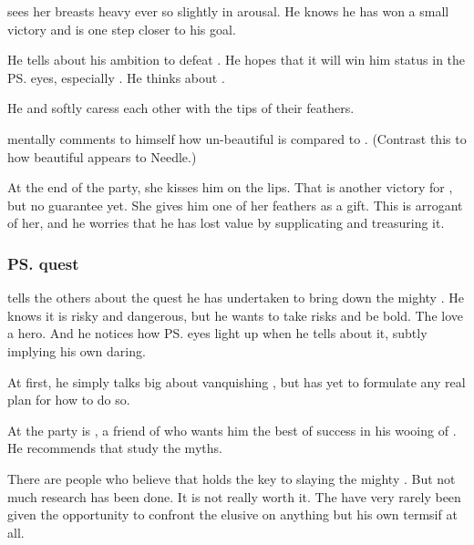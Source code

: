 \Teshrial{} sees her breasts heavy ever so slightly in arousal. 
He knows he has won a small victory and is one step closer to his goal. 

He tells about his ambition to defeat . 
He hopes that it will win him status in the \ps{\resviel}{} eyes, especially \Firaxel. 
He thinks about . 


He and \Firaxel{} softly caress each other with the tips of their feathers. 

\Teshrial{} mentally comments to himself how un-beautiful \Achsah{} is compared to \Firaxel. 
(Contrast this to how beautiful \Achsah{} appears to Needle.) 

At the end of the party, she kisses him on the lips. 
That is another victory for \Teshrial, but no guarantee yet. 
She gives him one of her feathers as a gift. 
This is arrogant of her, and he worries that he has lost value by supplicating and treasuring it. 





\subsubsection{\ps{\Teshrial} quest}
\Teshrial{} tells the others about the quest he has undertaken to bring down the mighty \Ishnaruchaefir. 
He knows it is risky and dangerous, but he wants to take risks and be bold. 
The \resviel{} love a hero. 
And he notices how \ps{\Firaxel} eyes light up when he tells about it, subtly implying his own daring. 

At first, he simply talks big about vanquishing \Ishnaruchaefir, but has yet to formulate any real plan for how to do so. 

At the party is , a friend of \Teshrial{} who wants him the best of success in his wooing of \Firaxel. 
He recommends that \Teshrial{} study the myths. 

There are people who believe that \WanderersInDarknessEmph holds the key to slaying the mighty \dragonlord. 
But not much research has been done. 
It is not really worth it. 
The have \resphain{} very rarely been given the opportunity to confront the elusive \Ishnaruchaefir{} on anything but his own terms\dash if at all. 

